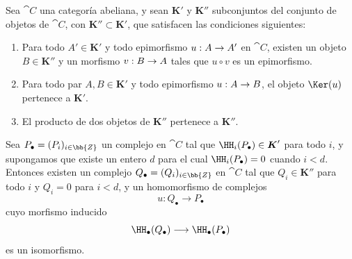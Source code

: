 \documentclass[oneside]{amsart}
\makeatletter
\newcommand{\ega@arrow}[2]{\mathchoice{#1}{#2}{#2}{#2}}
\renewcommand{\to}{\ega@arrow{\longrightarrow}{\rightarrow}}
\let\EGAOriginalLabel\label
\renewcommand{\label}[1]{\phantomsection\EGAOriginalLabel{#1}}
\makeatother
\begin{document}
\begin{proposition}[11.9.1]
\label{0.11.9.1}
Sea $\cat{C}$ una categoría abeliana, y sean $\boldsymbol K'$ y $\boldsymbol K''$ subconjuntos
del conjunto de objetos de $\cat{C}$, con $\boldsymbol K''\subset\boldsymbol K'$, que satisfacen las
condiciones siguientes:
\begin{enumerate}
  \item[{\rm(i)}]
  Para todo $A'\in\boldsymbol K'$ y todo epimorfismo $u:A\to A'$ en
  $\cat{C}$, existen un objeto $B\in\boldsymbol K''$ y un morfismo $v:B\to A$
  tales que $u\circ v$ es un epimorfismo.

  \item[{\rm(ii)}]
  Para todo par $A,B\in\boldsymbol K'$ y todo epimorfismo $u:A\to B$,
  el objeto $\Ker(u)$ pertenece a $\boldsymbol K'$.

  \item[{\rm(iii)}]
  El producto de dos objetos de $\boldsymbol K''$ pertenece a $\boldsymbol K''$.
\end{enumerate}

Sea $P_\bullet=(P_i)_{i\in\bb{Z}}$ un complejo en $\cat{C}$ tal
que $\HH_i(P_\bullet)\in\boldsymbol K'$ para todo $i$, y supongamos que existe un
entero $d$ para el cual $\HH_i(P_\bullet)=0$ cuando $i<d$.
Entonces existen un complejo $Q_\bullet=(Q_i)_{i\in\bb{Z}}$ en $\cat{C}$
tal que $Q_i\in\boldsymbol K''$ para todo $i$ y $Q_i=0$ para $i<d$, y un
homomorfismo de complejos
\[
  u:Q_\bullet\longrightarrow P_\bullet
\]
cuyo morfismo inducido
\[
  \HH_\bullet(Q_\bullet)\longrightarrow\HH_\bullet(P_\bullet)
\]
es un isomorfismo.
\end{proposition}
\end{document}
